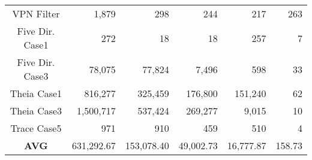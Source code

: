 \begin{table}[t]
{\begin{tabular}{@{}crrrrr@{}}
VPN Filter           & 1,879                         & 298                                & 244                                   & 217                              & 263                               \\
Five Dir. Case1      & 272                           & 18                                 & 18                                    & 257                              & 7                                 \\
Five Dir. Case3      & 78,075                        & 77,824                             & 7,496                                 & 598                              & 33                                \\
Theia Case1          & 816,277                       & 325,459                            & 176,800                               & 151,240                          & 62                                \\
Theia Case3          & 1,500,717                     & 537,424                            & 269,277                               & 9,015                            & 10                                \\
Trace Case5          & 971                           & 910                                & 459                                   & 510                              & 4                                 \\
\textbf{AVG}         & 631,292.67                       & 153,078.40                            & 49,002.73                                & 16,777.87                           & 158.73                               \\ \bottomrule
\end{tabular}
}
\end{table}